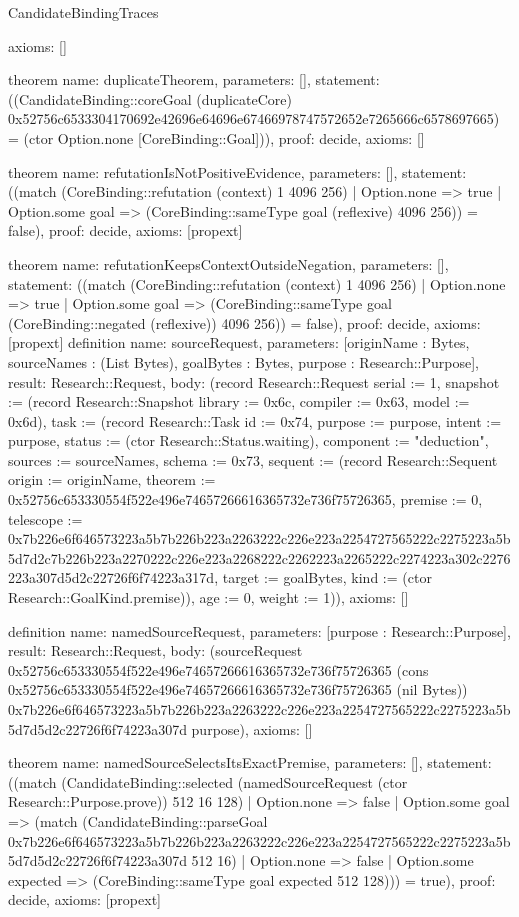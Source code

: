 \begin{lexlean}{CandidateBindingTraces}
\begin{semanticmodule}
{ axioms: []
}

theorem{
 name: duplicateTheorem,
 parameters: [],
 statement: ((CandidateBinding::coreGoal (duplicateCore) 0x52756c6533304170692e42696e64696e67466978747572652e7265666c6578697665) = (ctor Option.none [CoreBinding::Goal])),
 proof: decide{},
 axioms: []
}

theorem{
 name: refutationIsNotPositiveEvidence,
 parameters: [],
 statement: ((match (CoreBinding::refutation (context) 1 4096 256) | Option.none => true | Option.some goal => (CoreBinding::sameType goal (reflexive) 4096 256)) = false),
 proof: decide{},
 axioms: [propext]
}

theorem{
 name: refutationKeepsContextOutsideNegation,
 parameters: [],
 statement: ((match (CoreBinding::refutation (context) 1 4096 256) | Option.none => true | Option.some goal => (CoreBinding::sameType goal (CoreBinding::negated (reflexive)) 4096 256)) = false),
 proof: decide{},
 axioms: [propext]
}
definition{
 name: sourceRequest,
 parameters: [originName : Bytes, sourceNames : (List Bytes), goalBytes : Bytes, purpose : Research::Purpose],
 result: Research::Request,
 body: (record Research::Request {serial := 1, snapshot := (record Research::Snapshot {library := 0x6c, compiler := 0x63, model := 0x6d}), task := (record Research::Task {id := 0x74, purpose := purpose, intent := purpose, status := (ctor Research::Status.waiting), component := "deduction", sources := sourceNames, schema := 0x73, sequent := (record Research::Sequent {origin := originName, theorem := 0x52756c653330554f522e496e74657266616365732e736f75726365, premise := 0, telescope := 0x7b226e6f646573223a5b7b226b223a2263222c226e223a2254727565222c2275223a5b5d7d2c7b226b223a2270222c226e223a2268222c2262223a2265222c2274223a302c2276223a307d5d2c22726f6f74223a317d, target := goalBytes, kind := (ctor Research::GoalKind.premise)}), age := 0, weight := 1})}),
 axioms: []
}

definition{
 name: namedSourceRequest,
 parameters: [purpose : Research::Purpose],
 result: Research::Request,
 body: (sourceRequest 0x52756c653330554f522e496e74657266616365732e736f75726365 (cons 0x52756c653330554f522e496e74657266616365732e736f75726365 (nil Bytes)) 0x7b226e6f646573223a5b7b226b223a2263222c226e223a2254727565222c2275223a5b5d7d5d2c22726f6f74223a307d purpose),
 axioms: []
}

theorem{
 name: namedSourceSelectsItsExactPremise,
 parameters: [],
 statement: ((match (CandidateBinding::selected (namedSourceRequest (ctor Research::Purpose.prove)) 512 16 128) | Option.none => false | Option.some goal => (match (CandidateBinding::parseGoal 0x7b226e6f646573223a5b7b226b223a2263222c226e223a2254727565222c2275223a5b5d7d5d2c22726f6f74223a307d 512 16) | Option.none => false | Option.some expected => (CoreBinding::sameType goal expected 512 128))) = true),
 proof: decide{},
 axioms: [propext]
}


\end{semanticmodule}
\end{lexlean}
